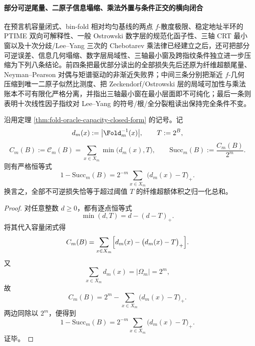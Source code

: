 \paragraph{部分可逆尾量、二原子信息塌缩、乘法外置与条件正交的横向闭合}
在预言机容量闭式、bin-fold 相对均匀基线的两点 \(f\)-散度极限、稳定地址半环的 PTIME 双向可解释性、一般 Ostrowski 数字层的规范化函子性、三轴 CRT 最小窗以及十次分歧/Lee--Yang 三次的 Chebotarev 乘法律已经建立之后，还可把部分可逆误差、信息几何塌缩、数字层局域性、三轴最小窗及跨指纹条件独立进一步压缩为下列八条结论。前四条把最优部分读出的全部损失先后还原为纤维超额尾量、Neyman--Pearson 对偶与矩谱驱动的非渐近失败界；中间三条分别把渐近 \(f\)-几何压缩到唯一二原子似然比测度、把 Zeckendorf/Ostrowski 层的局域可加性与乘法账本不可有限化严格分离，并指出三轴最小窗在最小层面即不可纯化；最后一条则表明十次线性因子指纹对 Lee--Yang 的符号/根/全分裂粗读出保持完全条件不变。

\begin{theorem}[最优部分可逆率的溢出恒等式]\label{thm:xi-time-part64b-optimal-partial-invertibility-overflow}
沿用定理 \ref{thm:fold-oracle-capacity-closed-form} 的记号。记
\[
d_m(x):=\bigl|\Fold_m^{-1}(x)\bigr|,
\qquad
T:=2^B,
\]
\[
C_m(B):=\mathcal C_m(B)=\sum_{x\in X_m}\min\bigl(d_m(x),T\bigr),
\qquad
\mathrm{Succ}_m(B):=\frac{C_m(B)}{2^m}.
\]
则有严格恒等式
\[
\boxed{\;
1-\mathrm{Succ}_m(B)
=
2^{-m}\sum_{x\in X_m}\bigl(d_m(x)-T\bigr)_+.\;}
\]
换言之，全部不可逆损失恰等于超过阈值 \(T\) 的纤维超额体积之归一化总和。
\end{theorem}
\begin{proof}
对任意整数 \(d\ge 0\)，都有逐点恒等式
\[
\min(d,T)=d-(d-T)_+.
\]
将其代入容量闭式得
\[
C_m(B)
=
\sum_{x\in X_m}\Bigl[d_m(x)-\bigl(d_m(x)-T\bigr)_+\Bigr].
\]
又
\[
\sum_{x\in X_m}d_m(x)=|\Omega_m|=2^m,
\]
故
\[
C_m(B)=2^m-\sum_{x\in X_m}\bigl(d_m(x)-T\bigr)_+.
\]
两边同除以 \(2^m\)，便得到
\[
1-\mathrm{Succ}_m(B)
=
2^{-m}\sum_{x\in X_m}\bigl(d_m(x)-T\bigr)_+.
\]
证毕。
\end{proof}

